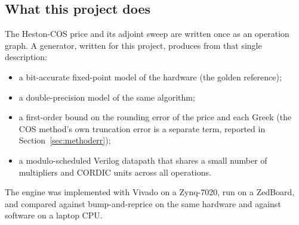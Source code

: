 \documentclass[11pt,a4paper]{article}
\begin{document}
\subsection{What this project does}
The Heston-COS price and its adjoint sweep are written once as an operation graph.
A generator, written for this project, produces from that single description:
\begin{itemize}
  \item a bit-accurate fixed-point model of the hardware (the golden reference);
  \item a double-precision model of the same algorithm;
  \item a first-order bound on the rounding error of the price and each Greek (the
  COS method's own truncation error is a separate term, reported in
  Section~\ref{sec:methoderr});
  \item a modulo-scheduled Verilog datapath that shares a small number of
  multipliers and CORDIC units across all operations.
\end{itemize}
The engine was implemented with Vivado on a Zynq-7020, run on a ZedBoard, and
compared against bump-and-reprice on the same hardware and against software on a
laptop CPU.
\end{document}
